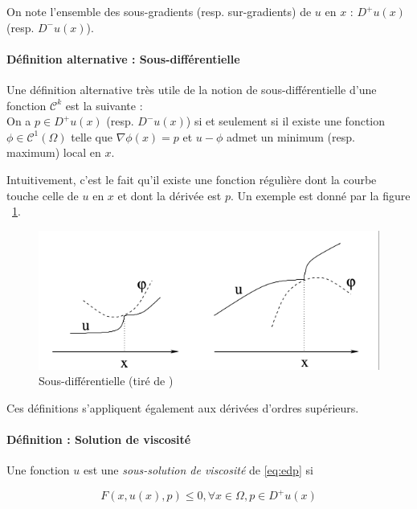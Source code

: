 \documentclass[12pt,a4paper,twoside]{article}
\begin{document}
On note l'ensemble des sous-gradients (resp. sur-gradients) de $u$ en $x$ : $D^{+}u(x)$ (resp. $D^{-}u(x)$). \\


\paragraph*{Définition alternative : Sous-différentielle}

Une définition alternative très utile  de la notion de sous-différentielle d'une fonction $\mathcal{C}^k$ est la suivante : \\

On a $p \in D^{+}u(x)$ (resp. $D^{-}u(x)$) si et seulement si il existe une fonction $\phi \in \mathcal{C}^1 (\Omega)$
telle que $\nabla \phi(x) = p$ et $u - \phi$ admet un minimum (resp. maximum) local en $x$.

Intuitivement, c'est le fait qu'il existe une fonction régulière dont la courbe touche celle de $u$ en $x$
et dont la dérivée est $p$. Un exemple est donné par la figure ~\ref{sousdiff}.

\begin{figure}
\begin{center}
\includegraphics[scale=0.6]{Images/sousdiff.png}
\caption{Sous-différentielle (tiré de \cite{bressan2010viscosity})}
\label{sousdiff}
\end{center}
\end{figure}

Ces définitions s'appliquent également aux dérivées d'ordres supérieurs.


\paragraph*{Définition : Solution de viscosité}

Une fonction $u$ est une \emph{sous-solution de viscosité} de \ref{eq:edp} si 

$$F(x,u(x),p) \leq 0, \forall x \in \Omega, p \in D^{+}u(x) $$
\end{document}
